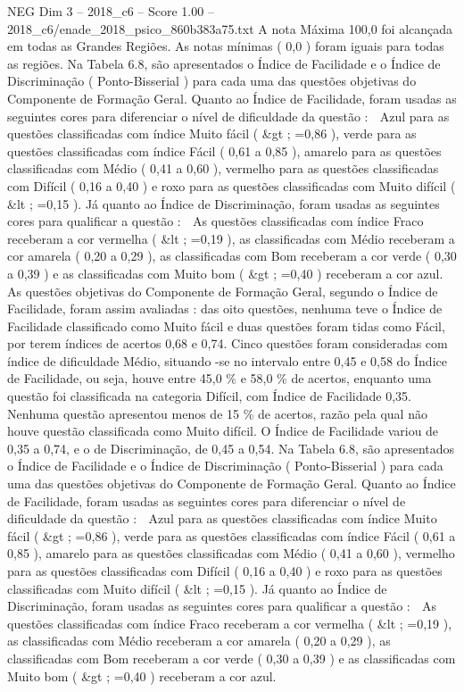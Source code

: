 \begin{textsample}{NEG Dim 3 – 2018\_c6 – Score 1.00 – 2018\_c6/enade\_2018\_psico\_860b383a75.txt}
A nota Máxima 100,0 foi alcançada em todas as Grandes Regiões.
As notas mínimas ( 0,0 ) foram iguais para todas as regiões.
Na Tabela 6.8, são apresentados o Índice de Facilidade e o Índice de Discriminação ( Ponto-Bisserial ) para cada uma das questões objetivas do Componente de Formação Geral.
Quanto ao Índice de Facilidade, foram usadas as seguintes cores para diferenciar o nível de dificuldade da questão :  Azul para as questões classificadas com índice Muito fácil ( \&gt ; =0,86 ), verde para as questões classificadas com índice Fácil ( 0,61 a 0,85 ), amarelo para as questões classificadas com Médio ( 0,41 a 0,60 ), vermelho para as questões classificadas com Difícil ( 0,16 a 0,40 ) e roxo para as questões classificadas com Muito difícil ( \&lt ; =0,15 ).
Já quanto ao Índice de Discriminação, foram usadas as seguintes cores para qualificar a questão :  As questões classificadas com índice Fraco receberam a cor vermelha ( \&lt ; =0,19 ), as classificadas com Médio receberam a cor amarela ( 0,20 a 0,29 ), as classificadas com Bom receberam a cor verde ( 0,30 a 0,39 ) e as classificadas com Muito bom ( \&gt ; =0,40 ) receberam a cor azul.
As questões objetivas do Componente de Formação Geral, segundo o Índice de Facilidade, foram assim avaliadas : das oito questões, nenhuma teve o Índice de Facilidade classificado como Muito fácil e duas questões foram tidas como Fácil, por terem índices de acertos 0,68 e 0,74.
Cinco questões foram consideradas com índice de dificuldade Médio, situando -se no intervalo entre 0,45 e 0,58 do Índice de Facilidade, ou seja, houve entre 45,0 \% e 58,0 \% de acertos, enquanto uma questão foi classificada na categoria Difícil, com Índice de Facilidade 0,35.
Nenhuma questão apresentou menos de 15 \% de acertos, razão pela qual não houve questão classificada como Muito difícil.
O Índice de Facilidade variou de 0,35 a 0,74, e o de Discriminação, de 0,45 a 0,54.
Na Tabela 6.8, são apresentados o Índice de Facilidade e o Índice de Discriminação ( Ponto-Bisserial ) para cada uma das questões objetivas do Componente de Formação Geral.
Quanto ao Índice de Facilidade, foram usadas as seguintes cores para diferenciar o nível de dificuldade da questão :  Azul para as questões classificadas com índice Muito fácil ( \&gt ; =0,86 ), verde para as questões classificadas com índice Fácil ( 0,61 a 0,85 ), amarelo para as questões classificadas com Médio ( 0,41 a 0,60 ), vermelho para as questões classificadas com Difícil ( 0,16 a 0,40 ) e roxo para as questões classificadas com Muito difícil ( \&lt ; =0,15 ).
Já quanto ao Índice de Discriminação, foram usadas as seguintes cores para qualificar a questão :  As questões classificadas com índice Fraco receberam a cor vermelha ( \&lt ; =0,19 ), as classificadas com Médio receberam a cor amarela ( 0,20 a 0,29 ), as classificadas com Bom receberam a cor verde ( 0,30 a 0,39 ) e as classificadas com Muito bom ( \&gt ; =0,40 ) receberam a cor azul.

\end{textsample}

